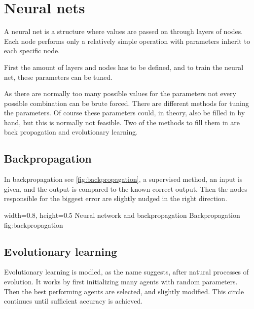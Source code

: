 \section{Neural nets} 
\label{sec:NN}
\cite[p727]{MA}
A neural net is a structure where values are passed on through layers of nodes. Each node performs only a relatively simple operation with parameters inherit to each specific node.

First the amount of layers and nodes has to be defined, and to train the neural net, these parameters can be tuned.

As there are normally too many possible values for the parameters not every possible combination can be brute forced. There are different methods for tuning the parameters. Of course these parameters could, in theory, also be filled in by hand, but this is normally not feasible. Two of the methods to fill them in are back propagation and evolutionary learning.

\subsection{Backpropagation}
In backpropagation see \autoref{fig:backpropagation}, a supervised method, an input is given, and the output is compared to the known correct output. Then the nodes responsible for the biggest error are slightly nudged in the right direction. 

    {width=0.8\textwidth, height=0.5\textheight} %
    {Neural network and backpropagation}   %
    {Backpropagation}   %
    {fig:backpropagation}    %
    
\subsection{Evolutionary learning}
Evolutionary learning is modled, as the name suggests, after natural processes of evolution. It works by first initializing many agents with random parameters. Then the best performing agents are selected, and slightly modified. This circle continues until sufficient accuracy is achieved.